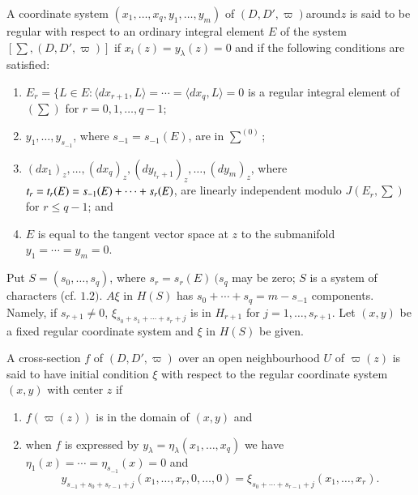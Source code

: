 \begin{defi*} %
  A coordinate system $(x_1,  \ldots ,  x_q ,  y_1,  \ldots ,  y_m)$
  of $(D,  D',  \varpi)$\break around\pageoriginale $z$ is said to be regular with respect
  to an ordinary integral element $E$ of the system $\left[ \sum,  (D,
    D',  \varpi) \right]$ if $x_i (z) = y_\lambda (z) = 0$ and if the
  following conditions are satisfied: 
  \begin{enumerate} [\rm (i)]
  \item $E_r = \{L \in E : \langle dx_{r+1} ,  L \rangle = \cdots =
    \langle dx_q ,  L \rangle = 0$ is a regular integral element of
    $\left(\sum\right)$ for $r = 0,  1,  \ldots ,  q-1$;  
  \item $y_1,  \ldots,  y_{s_{-1}}$,  where $s_{-1}=s_{-1}(E)$,  are
    in $\sum^{(0)}$;  

  \item $(dx_1)_z ,  \ldots ,  (dx_q)_z,  (dy_{t_r+1})_z,  \ldots ,
    (dy_m)_z$,  where $t_r = t_r (E) = s_{-1}\break (E) + \cdots + s_r (E)$,
    are linearly independent modulo $J (E_r,  \sum)$ for $r \le q-1$;
    and  
  \item $E$ is equal to the tangent vector space at $z$ to the
    submanifold $y_1 = \cdots = y_m = 0$. 
  \end{enumerate}
\end{defi*} 


 Put $S = (s_0,  \ldots ,  s_q)$,  where $s_r = s_r (E) ~ (s_q$ may be
 zero; $S$ is a system of characters (cf. $1.2)$. $A \xi $ in $H(S)$
 has $s_0 + \cdots + s_q = m-s_{-1}$ components. Namely,  if $s_{r+1}
 \neq 0$,  $\xi_{s_0 +s_1 + \cdots + s_r + j}$ is in $H_{r+1}$ for $j =
 1,  \ldots ,  s_{r+1}$. Let $(x,  y)$ be a fixed regular coordinate
 system and $\xi$ in $H(S)$ be given. 

\begin{defi*} %
   A cross-section $f$ of $(D,  D',  \varpi)$ over an open
   neighbourhood $U$ of $\varpi(z)$ is said to have initial condition
   $\xi$ with respect to the regular coordinate system $(x,  y)$ with
   center $z$ if 
   \begin{enumerate} [\rm (i)]
   \item $f(\varpi(z))$ is in the domain of $(x,  y) $ and  
   \item when $f$ is expressed by $y_\lambda = \eta _ \lambda (x_1 ,
     \ldots ,  x_q )$ we have $\eta _1 (x) = \cdots = \eta_{s_{-1}}(x)
     = 0$ and  
     $$
     y_{s_{-1}+s_0+s_{r-1}+ j} (x_1,  \ldots ,  x_r,  0,  \ldots ,  0)
     = \xi_{s_0 + \cdots + s_{r-1}+ j }(x_1 ,  \ldots ,  x_r). 
     $$
   \end{enumerate} 
\end{defi*} 
 
